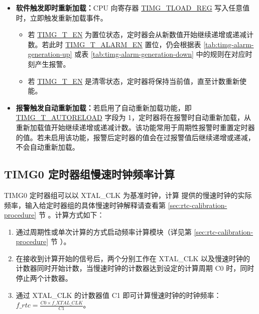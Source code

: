 \documentclass[main\_\_CN.tex]{subfiles}
\begin{document}
\begin{itemize}
    \item \textbf{软件触发即时重新加载：}CPU 向寄存器 \hyperref[regdesc:TIMGTXLOADREG]{TIMG\_TLOAD\_REG} 写入任意值时，立即触发重新加载事件。
    \begin{itemize}
        \item 若 \hyperref[fielddesc:TIMGTXEN]{TIMG\_T\_EN} 为置位状态，定时器会从新数值开始继续递增或递减计数。若此时 \hyperref[fielddesc:TIMGTXALARMEN]{TIMG\_T\_ALARM\_EN} 置位，仍会根据表 \ref{tab:timg-alarm-generation-up} \textit{} 或表 \ref{tab:timg-alarm-generation-down} \textit{} 中的规则在对应时刻产生报警。
        \item 若 \hyperref[fielddesc:TIMGTXEN]{TIMG\_T\_EN} 是清零状态，定时器将保持当前值，直至计数重新使能。
    \end{itemize}
    \item \textbf{报警触发自动重新加载：}若启用了自动重新加载功能，即 \hyperref[fielddesc:TIMGTXAUTORELOAD]{TIMG\_T\_AUTORELOAD} 字段为 1，定时器将在报警时自动重新加载，从重新加载值开始继续递增或递减计数。该功能常用于周期性报警时重置定时器的值。若未启用该功能，报警后定时器的值会在过报警值后继续递增或递减，不会自动重新加载。
\end{itemize}


\subsection{TIMG0 定时器组慢速时钟频率计算}
\label{sec:rtc-calibration-desc}

TIMG0 定时器组可以以 XTAL\_CLK 为基准时钟，计算 \chipname{} 提供的慢速时钟的实际频率，输入给定时器组的具体慢速时钟解释请查看第 \ref{sec:rtc-calibration-procedure} 节 \textit{}。计算方式如下：

\begin{enumerate}
    \item 通过周期性或单次计算的方式启动频率计算模块（详见第 \ref{sec:rtc-calibration-procedure} 节 \textit{}）。
    \item 在接收到计算开始的信号后，两个分别工作在 XTAL\_CLK 以及慢速时钟的计数器同时开始计数，当慢速时钟的计数器达到设定的计算周期 C0 时，同时停止两个计数器。
    \item 通过 XTAL\_CLK 的计数器值 C1 即可计算慢速时钟的时钟频率：$f\_rtc = \frac{C0 \times f\_XTAL\_CLK}{C1}$。
\end{enumerate}
\end{document}
